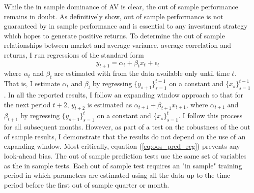 While the in sample dominance of AV is clear, the out of sample performance remains in doubt. As \citet{Welch2008} definitively show, out of sample performance is not guaranteed by in sample performance and is essential to any investment strategy which hopes to generate positive returns. To determine the out of sample relationships between market and average variance, average correlation and returns, I run regressions of the standard form
\begin{equation}
	\label{eq:oos_pred_reg}
	y_{t+1} = \alpha_{t} + \beta_{t}x_{t} + \epsilon_{t}
\end{equation}
where $\alpha_{t}$ and $\beta_{t}$ are estimated with from the data available only until time $t$. That is, I estimate
$\alpha_{t}$ and $ \beta_{t}$ by regressing $\{y_{s+1}\}_{s=1}^{t-1}$ on a constant and $\{x_{s}\}_{s=1}^{t-1}$. In all the reported results, I follow an expanding window approach so that for the next period $t+2$, $ y_{t+2}$ is estimated as $\alpha_{t+1} +  \beta_{t+1}x_{t+1}$, where $\alpha_{t+1}$ and $ \beta_{t+1}$ by regressing $\{y_{s+1}\}_{s=1}^{t}$ on a constant and $\{x_{s}\}_{s=1}^{t}$. I follow this process for all subsequent months. However, as part of a test on the robustness of the out of sample results, I demonstrate that the results do not depend on the use of an expanding window. Most critically, equation (\ref{eq:oos_pred_reg}) prevents any look-ahead bias. The out of sample prediction tests use the same set of variables as the in sample tests. Each out of sample test requires an "in sample" training period in which parameters are estimated using all the data up to the time period before the first out of sample quarter or month.

